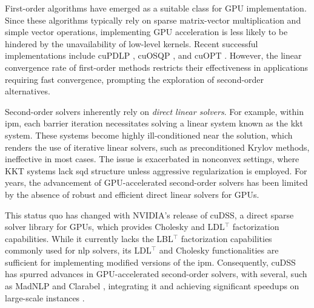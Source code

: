 \documentclass{article}
\begin{document}
First-order algorithms have emerged as a suitable class for GPU implementation. Since these algorithms typically rely on sparse matrix-vector multiplication and simple vector operations, implementing GPU acceleration is less likely to be hindered by the unavailability of low-level kernels. Recent successful implementations include cuPDLP \cite{luCuPDLPCStrengthenedImplementation2024,luCuPDLPFurtherEnhanced2025}, cuOSQP \cite{schubigerGPUAccelerationADMM2020}, and cuOPT \cite{NVIDIACuopt2025}. However, the linear convergence rate of first-order methods restricts their effectiveness in applications requiring fast convergence, prompting the exploration of second-order alternatives.

Second-order solvers inherently rely on \emph{direct linear solvers}. For example, within \gls*{ipm}, each barrier iteration necessitates solving a linear system known as the \gls*{kkt} system. These systems become highly ill-conditioned near the solution, which renders the use of iterative linear solvers, such as preconditioned Krylov methods, ineffective in most cases. The issue is exacerbated in nonconvex settings, where KKT systems lack \gls*{sqd} structure unless aggressive regularization is employed. For years, the advancement of GPU-accelerated second-order solvers has been limited by the absence of robust and efficient direct linear solvers for GPUs.

This status quo has changed with NVIDIA's release of cuDSS, a direct sparse solver library for GPUs, which provides Cholesky and LDL$^\top$ factorization capabilities. While it currently lacks the LBL$^\top$ factorization capabilities commonly used for \gls*{nlp} solvers, its LDL$^\top$ and Cholesky functionalities are sufficient for implementing modified versions of the \gls*{ipm}. Consequently, cuDSS has spurred advances in GPU-accelerated second-order solvers, with several, such as MadNLP \cite{shinAcceleratingOptimalPower2024} and Clarabel \cite{goulartClarabelInteriorpointSolver2024}, integrating it and achieving significant speedups on large-scale instances \cite{shinNVIDIACuDSSLibrary2024,shinAcceleratingOptimalPower2024,pacaudCondensedspaceMethodsNonlinear2024,shinScalableMultiPeriodAC2024,pacaudGPUacceleratedDynamicNonlinear2024}.
\end{document}
